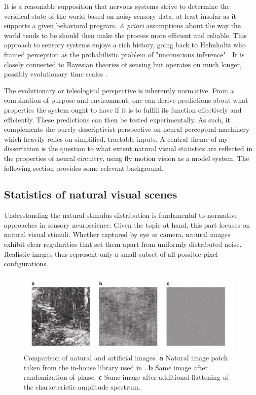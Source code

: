 It is a reasonable supposition that nervous systems strive to determine the veridical state of the world based on noisy sensory data, at least insofar as it supports a given behavioral program. \textit{A priori} assumptions about the way the world tends to be should then make the process more efficient and reliable. This approach to sensory systems enjoys a rich history, going back to Helmholtz who framed perception as the probabilistic problem of "unconscious inference" \citep{Helmholtz:1867aa}. It is closely connected to Bayesian theories of sensing but operates on much longer, possibly evolutionary time scales \citep{Doya:2007aa}.

The evolutionary or teleological perspective is inherently normative. From a combination of purpose and environment, one can derive predictions about what properties the system ought to have if it is to fulfill its function effectively and efficiently. These predictions can then be tested experimentally. As such, it complements the purely descriptivist perspective on neural perceptual machinery which heavily relies on simplified, tractable inputs. A central theme of my dissertation is the question to what extent natural visual statistics are reflected in the properties of neural circuitry, using fly motion vision as a model system. The following section provides some relevant background.

\subsection{Statistics of natural visual scenes}
Understanding the natural stimulus distribution is fundamental to normative approaches in sensory neuroscience. Given the topic at hand, this part focuses on natural visual stimuli. Whether captured by eye or camera, natural images exhibit clear regularities that set them apart from uniformly distributed noise. Realistic images thus represent only a small subset of all possible pixel configurations.

\begin{figure}
    \centering
    \includegraphics[width=1.025\textwidth]{graphics/figure_images}
    \caption[Natural and artificial images]
    {Comparison of natural and artificial images. \textbf{a} Natural image patch taken from the in-house library used in \citet{Leonhardt:2016ex}. \textbf{b} Same image after randomization of phase. \textbf{c} Same image after additional flattening of the characteristic amplitude spectrum.}
    \label{fig:image}
\end{figure}

